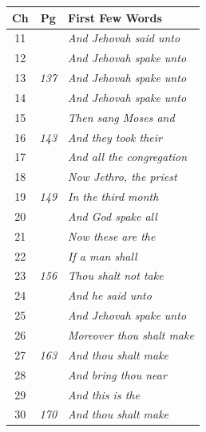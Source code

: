 \documentclass{article}
\newlength{\minipageheight}
\newlength{\minipagewidth}
\begin{document}
%
%
\begin{minipage}[r][\minipageheight][t]{\minipagewidth}%
    \begin{longtable}{ccl}
        \textbf{Ch} & \textbf{Pg}  & \textbf{First Few Words}          \\%
        \hline%
        \endfirsthead%
        11          &              & \textit{And Jehovah said unto}    \\
        12          &              & \textit{And Jehovah spake unto}   \\
        13          & \textit{137} & \textit{And Jehovah spake unto}   \\
        14          &              & \textit{And Jehovah spake unto}   \\
        15          &              & \textit{Then sang Moses and}      \\
        16          & \textit{143} & \textit{And they took their}      \\
        17          &              & \textit{And all the congregation} \\
        18          &              & \textit{Now Jethro, the priest}   \\
        19          & \textit{149} & \textit{In the third month}       \\
        20          &              & \textit{And God spake all}        \\
        21          &              & \textit{Now these are the}        \\
        22          &              & \textit{If a man shall}           \\
        23          & \textit{156} & \textit{Thou shalt not take}      \\
        24          &              & \textit{And he said unto}         \\
        25          &              & \textit{And Jehovah spake unto}   \\
        26          &              & \textit{Moreover thou shalt make} \\
        27          & \textit{163} & \textit{And thou shalt make}      \\
        28          &              & \textit{And bring thou near}      \\
        29          &              & \textit{And this is the}          \\
        30          & \textit{170} & \textit{And thou shalt make}      \\

\end{longtable}
\end{minipage}
\end{document}
